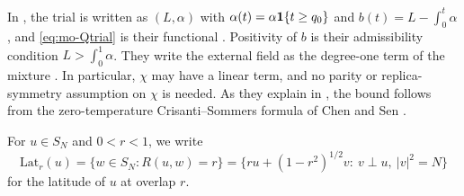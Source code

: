 In \cite{HuangSellke2024}, the trial is written as $(L,\alpha)$ with $\alpha(t)=\alpha\mathbf 1\{t\ge q_0\}$ and $b(t)=L-\int_0^t\alpha$, and \eqref{eq:mo-Qtrial} is their functional \cite[Eq.~(2.1)]{HuangSellke2024}. Positivity of $b$ is their admissibility condition $L>\int_0^1\alpha$. They write the external field as the degree-one term of the mixture \cite[footnote to Eq.~(1.1)]{HuangSellke2024}. In particular, $\chi$ may have a linear term, and no parity or replica-symmetry assumption on $\chi$ is needed. As they explain in \cite[Remark~2.6]{HuangSellke2024}, the bound follows from the zero-temperature Crisanti--Sommers formula of Chen and Sen \cite{ChenSen2017}.

For $u\in S_N$ and $0<r<1$, we write
\[
\mathrm{Lat}_r(u)=\{w\in S_N:R(u,w)=r\}=\bigl\{ru+(1-r^2)^{1/2}v:\ v\perp u,\ |v|^2=N\bigr\}
\]
for the latitude of $u$ at overlap $r$.

